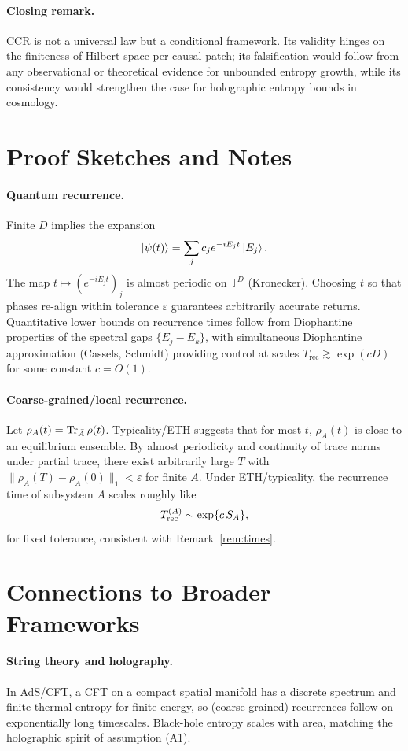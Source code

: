 \documentclass[12pt]{article}
\newcommand{\Trec}{T_{\text{rec}}}
\theoremstyle{remark}
\begin{document}
\paragraph{Closing remark.}
CCR is not a universal law but a conditional framework.
Its validity hinges on the finiteness of Hilbert space per causal patch;
its falsification would follow from any observational or theoretical evidence
for unbounded entropy growth, while its consistency would strengthen the case
for holographic entropy bounds in cosmology.



\section{Proof Sketches and Notes}

\paragraph{Quantum recurrence.}
Finite $D$ implies the expansion 
\[
|\psi(t)\rangle=\sum_j c_j e^{-iE_j t}\ket{E_j}.
\]
The map $t\mapsto (e^{-iE_j t})_j$ is almost periodic on $\mathbb{T}^D$ (Kronecker). 
Choosing $t$ so that phases re-align within tolerance $\varepsilon$ guarantees 
arbitrarily accurate returns. Quantitative lower bounds on recurrence times follow 
from Diophantine properties of the spectral gaps $\{E_j-E_k\}$, with simultaneous 
Diophantine approximation (Cassels, Schmidt) providing control at scales 
$\Trec \gtrsim \exp(cD)$ for some constant $c=O(1)$.

\paragraph{Coarse-grained/local recurrence.}
Let $\rho_A(t)=\Tr_{\bar A}\rho(t)$. Typicality/ETH suggests that for most $t$, 
$\rho_A(t)$ is close to an equilibrium ensemble. By almost periodicity and 
continuity of trace norms under partial trace, there exist arbitrarily large $T$ 
with $\|\rho_A(T)-\rho_A(0)\|_1<\varepsilon$ for finite $A$. 
Under ETH/typicality, the recurrence time of subsystem $A$ scales roughly like
\[
T^{(A)}_{\rm rec}\sim \exp\{c\,S_A\},
\]
for fixed tolerance, consistent with Remark~\ref{rem:times}. 

\section{Connections to Broader Frameworks}

\paragraph{String theory and holography.}
In AdS/CFT, a CFT on a compact spatial manifold has a discrete spectrum and 
finite thermal entropy for finite energy, so (coarse-grained) recurrences 
follow on exponentially long timescales. Black-hole entropy scales with area, 
matching the holographic spirit of assumption (A1). 
\end{document}
